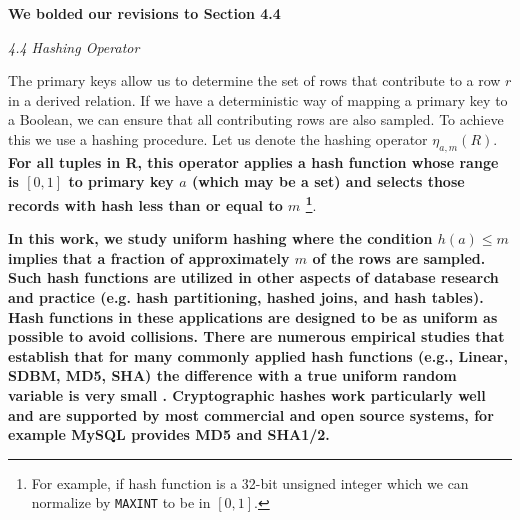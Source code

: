 \textbf{We bolded our revisions to Section 4.4}

\emph{4.4 Hashing Operator}

The primary keys allow us to determine the set of rows that contribute to a row $r$ in a derived relation.
If we have a deterministic way of mapping a primary key to a Boolean, we can ensure that all contributing rows are also sampled. 
To achieve this we use a hashing procedure.
Let us denote the hashing operator $\eta_{a, m}(R)$. 
\textbf{For all tuples in R, this operator applies a hash function whose range is $[0,1]$ to primary key $a$ (which may be a set) and selects those records with hash less than or equal to $m$ \footnote{For example, if hash function is a 32-bit unsigned integer which we can normalize by \texttt{MAXINT} to be in $[0,1]$.}}.

\textbf{
In this work, we study uniform hashing where the condition $h(a) \le m$ implies that a fraction of approximately $m$ of the rows are sampled.
Such hash functions are utilized in other aspects of database research and practice (e.g. hash partitioning, hashed joins, and hash tables).
Hash functions in these applications are designed to be as uniform as possible to avoid collisions.
There are numerous empirical studies that establish that for many commonly applied hash functions (e.g., Linear, SDBM, MD5, SHA) the difference with a true uniform random variable is very small \cite{henke2009empirical, l2007testu01}.
Cryptographic hashes work particularly well and are supported by most commercial and open source systems, for example MySQL provides MD5 and SHA1/2.}


